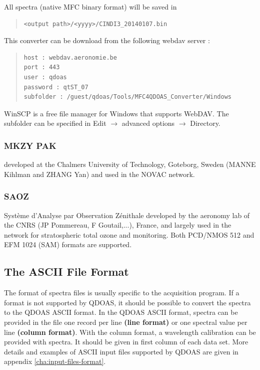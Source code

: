 All spectra (native MFC binary format) will be saved in 

\begin{quote}
\begin{Verbatim}[fontfamily=courier,fontsize=\relsize{-4}]
<output path>/<yyyy>/CINDI3_20140107.bin
\end{Verbatim}
\end{quote}
This converter can be download from the following webdav server :

\begin{quote}
\begin{Verbatim}[fontfamily=courier,fontsize=\relsize{-2}]
host : webdav.aeronomie.be
port : 443
user : qdoas
password : qtST_07
subfolder : /guest/qdoas/Tools/MFC4QDOAS_Converter/Windows
\end{Verbatim}
\end{quote}

WinSCP is a free file manager for Windows that supports WebDAV.  The subfolder can be specified in Edit $\rightarrow$ advanced options $\rightarrow$ Directory.

\subsubsection{MKZY PAK}

developed at the Chalmers University of Technology, Goteborg, Sweden (MANNE Kihlman and ZHANG Yan) and used in the NOVAC network.

\subsubsection{SAOZ}

Système d'Analyse par Observation Zénithale developed by the aeronomy lab of the CNRS (JP Pommereau, F Goutail,...), France, and largely used in the  network for stratospheric total ozone and  monitoring.   Both PCD/NMOS 512 and EFM 1024 (SAM) formats are supported.

\subsection{The ASCII File Format}
The format of spectra files is usually specific to the acquisition program.  If a format is not supported by QDOAS, it should be possible to convert the spectra to the QDOAS ASCII format. In the QDOAS ASCII format, spectra can be provided in the file one record per line \textbf{(line format)} or one spectral value per line \textbf{(column format)}.  
With the column format, a wavelength calibration can be provided with spectra.  It should
be given in first column of each data set.  More details and examples of ASCII input files supported by QDOAS are given in appendix \ref{cha:input-files-format}.

